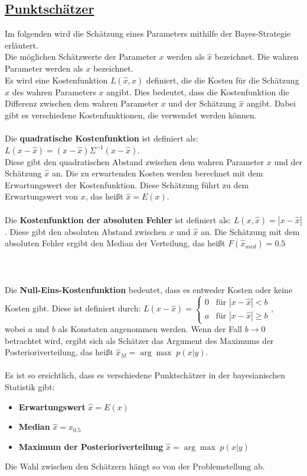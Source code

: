 \documentclass[a4paper,12pt]{article}
\begin{document}
\subsection*{\underline{Punktschätzer}}
Im folgenden wird die Schätzung eines Parameters mithilfe der Bayes-Strategie erläutert. \\
Die möglichen Schätzwerte der Parameter $x$ werden als $\hat{x}$ bezeichnet. Die wahren Parameter werden als $x$ bezeichnet. \\
Es wird eine Kostenfunktion $L(\hat{x},x)$ definiert, die die Kosten für die Schätzung $\hat{x}$ des wahren Parameters $x$ angibt.
Dies bedeutet, dass die Kostenfunktion die Differenz zwischen dem wahren Parameter $x$ und der Schätzung $\hat{x}$ angibt.
Dabei gibt es verschiedene Kostenfunktionen, die verwendet werden können. \parencite[65]{EinfBayesStatistik} \\\\
Die \textbf{quadratische Kostenfunktion} ist definiert als: $L(x-\hat{x}) = (x-\hat{x})\Sigma^{-1}(x-\hat{x})$. \\
Diese gibt den quadratischen Abstand zwischen dem wahren Parameter $x$ und der Schätzung $\hat{x}$ an.
Die zu erwartenden Kosten werden berechnet mit dem Erwartungswert der Kostenfunktion.
Diese Schätzung führt zu dem Erwartungswert von $x$, das heißt $\hat{x} = E(x)$. \parencite[65-66]{EinfBayesStatistik} \\\\
Die \textbf{Kostenfunktion der absoluten Fehler} ist definiert als: $L(x,\hat{x}) = |x-\hat{x}|$.
Diese gibt den absoluten Abstand zwischen $x$ und $\hat{x}$ an.
Die Schätzung mit dem absoluten Fehler ergibt den Median der Verteilung, das heißt $F(\hat{x}_{med}) = 0.5$ \parencite[67-68]{EinfBayesStatistik} \\\\\\\\
Die \textbf{Null-Eins-Kostenfunktion} bedeutet, dass es entweder Kosten oder keine Kosten gibt.
Diese ist definiert durch: $L(x-\hat{x}) = 
\begin{cases}
  0 & \text{für } |x-\hat{x}| < b \\
  a & \text{für } |x-\hat{x}| \geq b
\end{cases}$,\\
wobei $a$ und $b$ als Konstaten angenommen werden. Wenn der Fall $b \to 0$ betrachtet wird,
ergibt sich als Schätzer das Argument des Maximums der Posterioriverteilung, das heißt $\hat{x}_M = \arg \max \; p(x|y)$. \parencite[68-69]{EinfBayesStatistik}\\\\
Es ist so ersichtlich, dass es verschiedene Punktschätzer in der bayesianischen Statistik gibt:
\begin{itemize}
  \item \textbf{Erwartungswert} $\hat{x} = E(x)$
  \item \textbf{Median} $\hat{x} = x_{0.5}$
  \item \textbf{Maximum der Posterioriverteilung} $\hat{x} = \arg \max \; p(x|y)$
\end{itemize}
Die Wahl zwischen den Schätzern hängt so von der Problemstellung ab.
\end{document}
